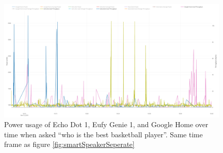 \begin{figure}[H]
  \centering
  \includegraphics[width=1\textwidth]{figures/smartSpeakerNetworkSeperate.png}
  \caption{Power usage of Echo Dot 1, Eufy Genie 1, and Google Home over time when asked ``who is the best basketball player''. Same time frame as figure \ref{fig:smartSpeakerSeperate}}
  \label{fig:smartSpeakerNetworkSeperate}
\end{figure}
